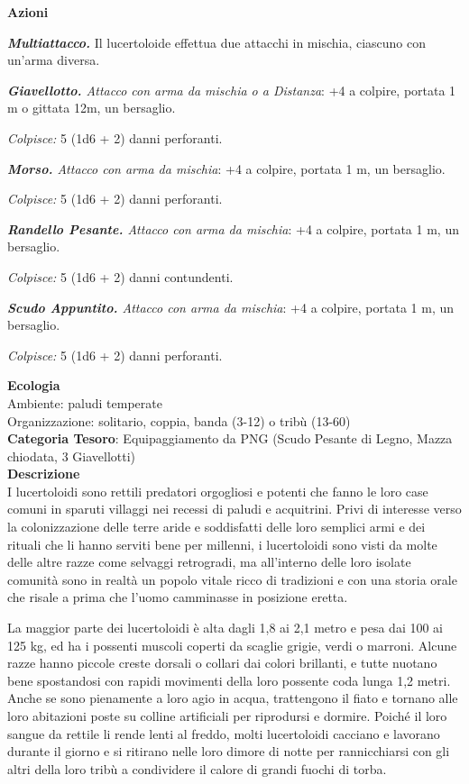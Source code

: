 \begin{multicols}{2}
{\textbf{Azioni}

\emph{\textbf{Multiattacco.}} Il lucertoloide effettua due attacchi in mischia, ciascuno con un'arma diversa.

\emph{\textbf{Giavellotto.} Attacco con arma da mischia o a Distanza}: +4 a colpire, portata 1 m o gittata 12m, un bersaglio.

\emph{Colpisce:} 5 (1d6 + 2) danni perforanti.

\emph{\textbf{Morso.} Attacco con arma da mischia}: +4 a colpire, portata 1 m, un bersaglio.

\emph{Colpisce:} 5 (1d6 + 2) danni perforanti.

\emph{\textbf{Randello Pesante.} Attacco con arma da mischia}: +4 a colpire, portata 1 m, un bersaglio.

\emph{Colpisce:} 5 (1d6 + 2) danni contundenti.

\emph{\textbf{Scudo Appuntito.} Attacco con arma da mischia}: +4 a colpire, portata 1 m, un bersaglio.

\emph{Colpisce:} 5 (1d6 + 2) danni perforanti.

\textbf{Ecologia}\\
Ambiente: paludi temperate\\
Organizzazione: solitario, coppia, banda (3-12) o tribù (13-60)\\
\textbf{Categoria Tesoro}: Equipaggiamento da PNG (Scudo Pesante di Legno, Mazza chiodata, 3 Giavellotti)\\

\textbf{Descrizione}\\
I lucertoloidi sono rettili predatori orgogliosi e potenti che fanno le loro case comuni in sparuti villaggi nei recessi di paludi e acquitrini. Privi di interesse verso la colonizzazione delle terre aride e soddisfatti delle loro semplici armi e dei rituali che li hanno serviti bene per millenni, i lucertoloidi sono visti da molte delle altre razze come selvaggi retrogradi, ma all'interno delle loro isolate comunità sono in realtà un popolo vitale ricco di tradizioni e con una storia orale che risale a prima che l'uomo camminasse in posizione eretta.

La maggior parte dei lucertoloidi è alta dagli 1,8 ai 2,1 metro e pesa dai 100 ai 125 kg, ed ha i possenti muscoli coperti da scaglie grigie, verdi o marroni. Alcune razze hanno piccole creste dorsali o collari dai colori brillanti, e tutte nuotano bene spostandosi con rapidi movimenti della loro possente coda lunga 1,2 metri. Anche se sono pienamente a loro agio in acqua, trattengono il fiato e tornano alle loro abitazioni poste su colline artificiali per riprodursi e dormire. Poiché il loro sangue da rettile li rende lenti al freddo, molti lucertoloidi cacciano e lavorano durante il giorno e si ritirano nelle loro dimore di notte per rannicchiarsi con gli altri della loro tribù a condividere il calore di grandi fuochi di torba.

}
\end{multicols}

